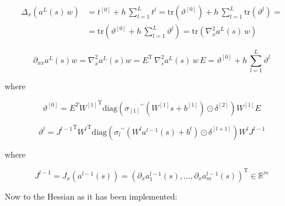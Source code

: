 \begin{align*}
    \Delta_x (a^{L}(s) \, w) & = t^{[0]} + h \, \sum^{L}_{l=1} t^{l} = \mathrm{tr}(\vartheta^{[0]}) + h \, \sum^{L}_{l=1} \mathrm{tr}(\vartheta^{l}) = \\
    & = \mathrm{tr} \left( \vartheta^{[0]} + h \, \sum^{L}_{l=1} \vartheta^{l} \right) = \mathrm{tr} \left( \nabla^{2}_x a^{L}(s) \, w \right)
\end{align*}

\begin{equation*}
    \partial_{xx} a^{L}(s) w = \nabla^{2}_x a^{L}(s) w = E^{\mathrm{T}} \, \nabla^{2}_s a^{L}(s) \, w \, E = \vartheta^{[0]} + h \, \sum^{L}_{l=1} \vartheta^{l}
\end{equation*}

where 

\begin{equation*}
    \vartheta^{[0]} = E^T {W^{[1]}}^{\mathrm{T}} \mathrm{diag}({\sigma_{[1]}}^{\prime \prime}(W^{[1]} s + b^{[1]}) \odot \delta^{[2]}) W^{[1]} E
\end{equation*}

\begin{equation*}
    \vartheta^{l} = {J^{l-1}}^{\mathrm{T}} {W^{l}}^{\mathrm{T}} \mathrm{diag}({\sigma_{l}}^{\prime \prime}(W^{l} a^{l-1}(s) + b^{l}) \odot \delta^{[l+1]}) W^{l} J^{l-1}
\end{equation*}

where 

\begin{equation*}
    J^{l-1} = J_x(a^{l-1}(s)) = \left( \partial_x a^{l-1}_1(s), \ldots, \partial_x a^{l-1}_m(s) \right)^{\mathrm{T}} \in \mathbb{R}^{m}
\end{equation*}


Now to the Hessian as it has been implemented: 

